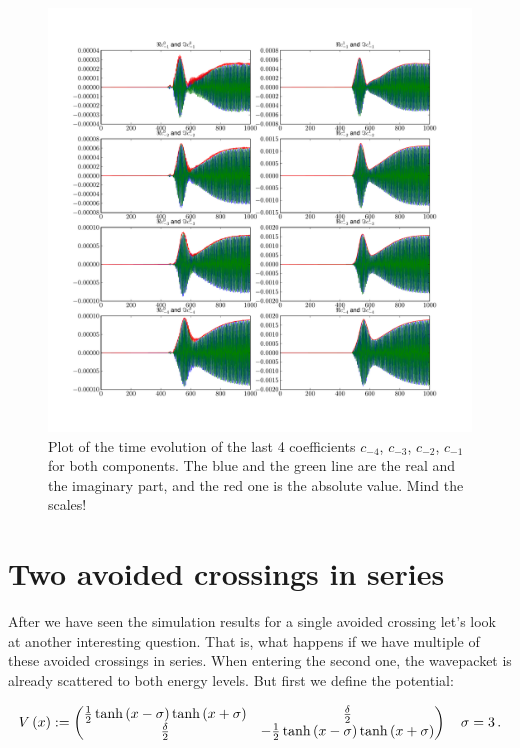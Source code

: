 \begin{figure}
  \centering
  \includegraphics[width=\linewidth]{./plot/delta_gap/Parameters_h_dt0.01_eps0.1_d1.0e_p1/hagedorn_coefficients_last.pdf}
  \caption{Plot of the time evolution of the last 4 coefficients $c_{-4}$, $c_{-3}$, $c_{-2}$, $c_{-1}$ for both components. The blue and the green line are the
  real and the imaginary part, and the red one is the absolute value. Mind the scales!}
  \label{fig:delta_gap_coefficients_last}
\end{figure}


\section{Two avoided crossings in series}
\label{sec:two_crossings}

After we have seen the simulation results for a single avoided crossing let's look at
another interesting question. That is, what happens if we have multiple of these
avoided crossings in series. When entering the second one, the wavepacket is
already scattered to both energy levels. But first we define the potential:

\begin{equation} \label{pot:two_crossings}
  V\left( x \right) :=
  \begin{pmatrix}
    \frac{1}{2} \tanh\left( x-\sigma \right) \tanh\left( x+\sigma \right) & \frac{\delta}{2} \\
    \frac{\delta}{2}                                    & -\frac{1}{2} \tanh\left( x-\sigma \right) \tanh\left( x+\sigma \right)
  \end{pmatrix} \quad \sigma = 3 \,.
\end{equation}

